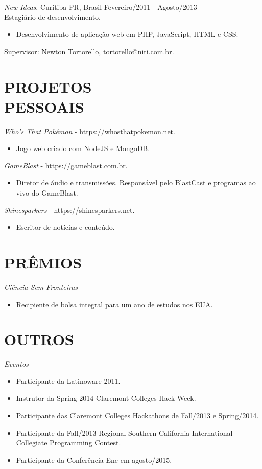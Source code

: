 \documentclass[margin]{res}
\begin{document}
\begin{resume}
			{\sl New Ideas}, Curitiba-PR, Brasil \hfill Fevereiro/2011 - Agosto/2013 \\
			Estagiário de desenvolvimento.
			\begin{itemize}
				\itemsep -2pt
		    	\item Desenvolvimento de aplicação web em PHP, JavaScript, HTML e CSS.
			\end{itemize}
			Supervisor: Newton Tortorello, \href{mailto:tortorello@niti.com.br}{tortorello@niti.com.br}.
			
		\section{PROJETOS \\ PESSOAIS}
			{\sl Who's That Pokémon} - \href{https://whosthatpokemon.net}{https://whosthatpokemon.net}.
			\begin{itemize}
				\item[] Jogo web criado com NodeJS e MongoDB.
			\end{itemize}
			{\sl GameBlast} - \href{https://gameblast.com.br}{https://gameblast.com.br}.
			\begin{itemize}
				\item[] Diretor de áudio e transmissões. Responsável pelo BlastCast e programas ao vivo do GameBlast.
			\end{itemize}
			{\sl Shinesparkers} - \href{https://shinesparkers.net}{https://shinesparkers.net}.
			\begin{itemize}
				\item[] Escritor de notícias e conteúdo.
			\end{itemize}
	
		\section{PRÊMIOS}
			{\sl Ciência Sem Fronteiras}
			\begin{itemize}
				\item[] Recipiente de bolsa integral para um ano de estudos nos EUA.
			\end{itemize}

		\section{OUTROS}
			{\sl Eventos}
			\begin{itemize}
				\item[] Participante da Latinoware 2011.
				\item[] Instrutor da Spring 2014 Claremont Colleges Hack Week.
				\item[] Participante das Claremont Colleges Hackathons de Fall/2013 e Spring/2014.
				\item[] Participante da Fall/2013 Regional Southern California International Collegiate Programming Contest.
				\item[] Participante da Conferência Ene em agosto/2015.
			\end{itemize}


\end{resume}
\end{document}
